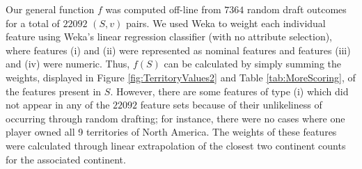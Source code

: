 \documentclass[letterpaper]{article}
\numberwithin{equation}{section}
\numberwithin{theorem}{section}
\numberwithin{lemma}{section}
\numberwithin{df}{section}
\begin{document}
Our general function $f$ was computed off-line from $7364$ random draft outcomes for a total of $22092$ $(S,v)$ pairs.  We used Weka \cite{Weka} to weight each individual feature using Weka's linear regression classifier (with no attribute selection), where features (i) and (ii) were represented as nominal features and features (iii) and (iv) were numeric.  Thus, $f(S)$ can be calculated by simply summing the weights, displayed in Figure \ref{fig:TerritoryValues2} and Table \ref{tab:MoreScoring}, of the features present in $S$.  However, there are some features of type (i) which did not appear in any of the $22092$ feature sets because of their unlikeliness of occurring through random drafting; for instance, there were no cases where one player owned all 9 territories of North America.  The weights of these features were calculated through linear extrapolation of the closest two continent counts for the associated continent.  %
\end{document}
